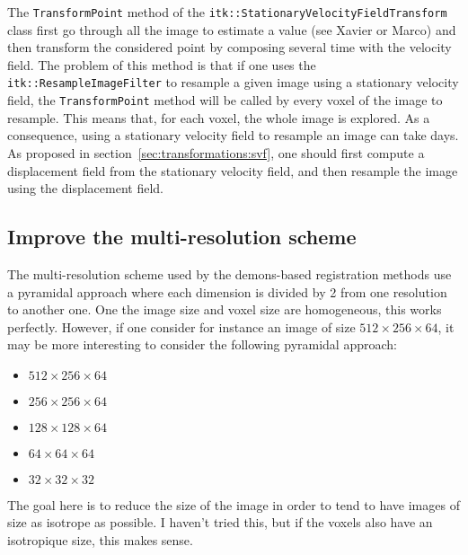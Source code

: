 The \texttt{TransformPoint} method of the \texttt{itk::StationaryVelocityFieldTransform} class first go through all the image to estimate a value (see Xavier or Marco) and then transform the considered point by composing several time with the velocity field. The problem of this method is that if one uses the \texttt{itk::ResampleImageFilter} to resample a given image using a stationary velocity field, the \texttt{TransformPoint} method will be called by every voxel of the image to resample. This means that, for each voxel, the whole image is explored. As a consequence, using a stationary velocity field to resample an image can take days. As proposed in section~\ref{sec:transformations:svf}, one should first compute a displacement field from the stationary velocity field, and then resample the image using the displacement field.



\subsection{Improve the multi-resolution scheme}

The multi-resolution scheme used by the demons-based registration methods use a pyramidal approach where each dimension is divided by 2 from one resolution to another one. One the image size and voxel size are homogeneous, this works perfectly. However, if one consider for instance an image of size $512 \times 256 \times 64$, it may be more interesting to consider the following pyramidal approach:
%
\begin{itemize}
\item $512 \times 256 \times 64$
\item $256 \times 256 \times 64$
\item $128 \times 128 \times 64$
\item $64 \times 64 \times 64$
\item $32 \times 32 \times 32$
\end{itemize}
%
The goal here is to reduce the size of the image in order to tend to have images of size as isotrope as possible. I haven't tried this, but if the voxels also have an isotropique size, this makes sense.
